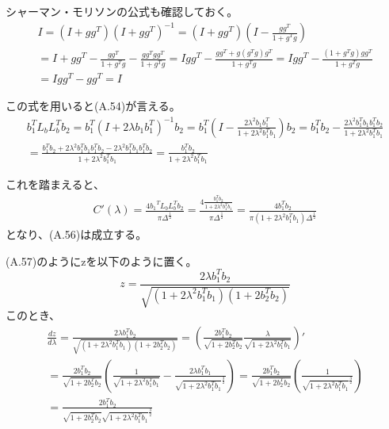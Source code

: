 \documentclass{jsarticle}
\begin{document}
シャーマン・モリソンの公式も確認しておく。
\begin{equation}
\begin{split}
I = (I + gg^T)(I + gg^T)^{-1} = (I + gg^T)(I - \frac{gg^T}{1 + g^T g})\\
= I + gg^T - \frac{gg^T}{1 + g^T g} - \frac{gg^Tgg^T}{1 + g^T g}
= I gg^T - \frac{gg^T + g(g^Tg)g^T}{1 + g^T g}
= I gg^T - \frac{(1 + g^Tg)gg^T}{1 + g^T g}\\
= I gg^T - gg^T = I
\end{split}
\end{equation}

この式を用いると(A.54)が言える。
\begin{equation}
\begin{split}
b_1^T L_b L_b^T b_2 =b_1^T (I + 2\lambda b_1 b_1^T)^{-1} b_2
= b_1^T (I - \frac{2 \lambda^2 b_1b_1^T}{1 + 2 \lambda^2 b_1^T b_1})b_2
=  b_1^T b_2 - \frac{2 \lambda^2 b_1^T b_1b_1^Tb_2}{1 + 2 \lambda^2 b_1^T b_1}\\
=  \frac{b_1^T b_2 + 2 \lambda^2 b_1^T b_1b_1^Tb_2 - 2 \lambda^2 b_1^T b_1b_1^Tb_2}{1 + 2 \lambda^2 b_1^T b_1}
=  \frac{b_1^T b_2}{1 + 2 \lambda^2 b_1^T b_1}
\end{split}
\end{equation}

これを踏まえると、
\begin{equation}
\begin{split}
C'(\lambda) = \frac{4{b_1}^T L_b L_b^T b_2}{\pi\Delta^{\frac{1}{2}}}
= \frac{4 \frac{b_1^T b_2}{1 + 2 \lambda^2 b_1^T b_1}}{\pi\Delta^{\frac{1}{2}}}
= \frac{4 b_1^T b_2}{\pi(1 + 2 \lambda^2 b_1^T b_1)\Delta^{\frac{1}{2}}}
\end{split}
\end{equation}
となり、(A.56)は成立する。

(A.57)のようにzを以下のように置く。
\begin{equation}
z = \frac{2\lambda b_1^T b_2}{\sqrt{(1 + 2\lambda^2 b_1^T b_1)(1 + 2b_2^T b_2)}}
\end{equation}
このとき、
\begin{equation}
\begin{split}
\frac{dz}{d\lambda} = \frac{2\lambda b_1^T b_2}{\sqrt{(1 + 2\lambda^2 b_1^T b_1)(1 + 2b_2^T b_2)}}
= (\frac{2 b_1^T b_2}{\sqrt{1 + 2b_2^T b_2}}\frac{\lambda}{\sqrt{1 + 2\lambda^2 b_1^T b_1}})'\\
= \frac{2 b_1^T b_2}{\sqrt{1 + 2b_2^T b_2}}(\frac{1}{\sqrt{1 + 2\lambda^2 b_1^T b_1}} - \frac{2\lambda b_1^T b_1}{\sqrt{1 + 2\lambda^2 b_1^T b_1}^{\frac{3}{2}}})
= \frac{2 b_1^T b_2}{\sqrt{1 + 2b_2^T b_2}}(\frac{1}{\sqrt{1 + 2\lambda^2 b_1^T b_1}^{\frac{3}{2}}})\\
= \frac{2 b_1^T b_2}{\sqrt{1 + 2b_2^T b_2}\sqrt{1 + 2\lambda^2 b_1^T b_1}^{\frac{3}{2}}}
\end{split}
\end{equation}
\end{document}

